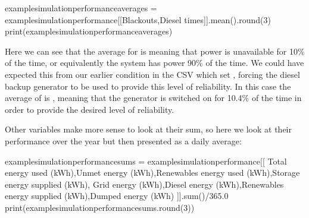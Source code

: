 \documentclass[letterpaper,10pt,english]{sphinxmanual}
\begin{document}
\begin{sphinxVerbatim}[commandchars=\\\{\}]
example\PYGZus{}simulation\PYGZus{}performance\PYGZus{}averages = example\PYGZus{}simulation\PYGZus{}performance[[\PYGZsq{}Blackouts\PYGZsq{},\PYGZsq{}Diesel times\PYGZsq{}]].mean().round(3)
print(example\PYGZus{}simulation\PYGZus{}performance\PYGZus{}averages)
\end{sphinxVerbatim}

\begin{sphinxVerbatim}[commandchars=\\\{\}]
       
     
 
\end{sphinxVerbatim}

\sphinxAtStartPar
Here we can see that the average for  is  meaning
that power is unavailable for 10\% of the time, or equivalently the
system has power 90\% of the time. We could have expected this from our
earlier condition in the  CSV which set
, forcing the diesel backup generator
to be used to provide this level of reliability. In this case the
average of  is , meaning that the generator is
switched on for 10.4\% of the time in order to provide the desired level
of reliability.

\sphinxAtStartPar
Other variables make more sense to look at their sum, so here we look at
their performance over the year but then presented as a daily average:

\begin{sphinxVerbatim}[commandchars=\\\{\}]
example\PYGZus{}simulation\PYGZus{}performance\PYGZus{}sums = example\PYGZus{}simulation\PYGZus{}performance[[
    \PYGZsq{}Total energy used (kWh)\PYGZsq{},\PYGZsq{}Unmet energy (kWh)\PYGZsq{},\PYGZsq{}Renewables energy used (kWh)\PYGZsq{},\PYGZsq{}Storage energy supplied (kWh)\PYGZsq{},
    \PYGZsq{}Grid energy (kWh)\PYGZsq{},\PYGZsq{}Diesel energy (kWh)\PYGZsq{},\PYGZsq{}Renewables energy supplied (kWh)\PYGZsq{},\PYGZsq{}Dumped energy (kWh)\PYGZsq{}
    ]].sum()/365.0
print(example\PYGZus{}simulation\PYGZus{}performance\PYGZus{}sums.round(3))
\end{sphinxVerbatim}
\end{document}
